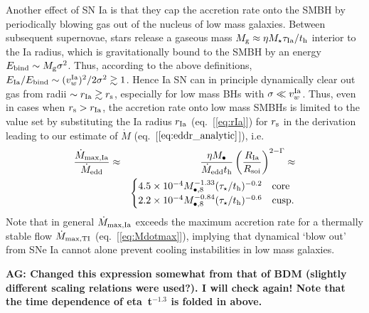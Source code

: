 \documentclass[usenatbib,fleqn]{mn2e}
\newcommand{\Mbheight}{M_{\bullet,8}}
\begin{document}
Another effect of SN Ia is that they cap the accretion rate onto the SMBH by periodically blowing gas out of the nucleus of low mass galaxies.  Between subsequent supernovae, stars release a gaseous mass $M_{\rm g} \approx \eta M_{\star}\tau_{\rm Ia}/t_{\rm h}$ interior to the Ia radius, which is gravitationally bound to the SMBH by an energy $E_{\rm bind} \sim M_{\rm g}\sigma^{2}$.  Thus, according to the above definitions, $E_{\rm Ia}/E_{\rm bind} \sim (v_{w}^{\rm Ia})^{2}/2\sigma^{2} \gtrsim 1$.  Hence Ia SN can in principle dynamically clear out gas from radii $\sim r_{\rm Ia} \gtrsim r_{\rm s}$, especially for low mass BHs with $\sigma \ll v^{\rm Ia}_{w}$.  Thus, even in cases when $r_{\rm s} > r_{\rm Ia}$, the accretion rate onto low mass SMBHs is limited to the value set by substituting the Ia radius $r_{\rm Ia}$ (eq.~[\ref{eq:rIa}]) for $r_{\rm s}$ in the derivation leading to our estimate of $\dot{M}$ (eq.~[$\ref{eq:eddr_analytic}$]), i.e.  
\begin{eqnarray}
\frac{\dot{M}_{\rm max,Ia}}{\dot{M}_{\rm edd}} &\approx& \frac{\eta M_{\bullet}}{\dot{M}_{\rm edd} t_{\rm h}}\left(\frac{R_{\rm Ia}}{R_{\rm soi}}\right)^{2-\Gamma} \approx \nonumber \\
 && \begin{cases}
    4.5 \times 10^{-4} M_{\bullet,8}^{-1.33}(\tau_{\star}/t_{\rm h})^{-0.2}
   & \text{core} \\
    2.2 \times 10^{-4} \Mbheight^{-0.84}(\tau_{\star}/t_{\rm h})^{-0.6}   & \text{cusp}.
  \end{cases}
  \label{eq:eddr_Ia}
\end{eqnarray}
Note that in general $\dot{M}_{\rm max,Ia}$ exceeds the maximum accretion rate for a thermally stable flow $\dot{M}_{\rm max,TI}$ (eq.~[\ref{eq:Mdotmax}]), implying that dynamical `blow out' from SNe Ia cannot alone prevent cooling instabilities in low mass galaxies.

{\bf AG: Changed this expression somewhat from that of BDM (slightly
  different scaling relations were used?). I will
  check again! Note that the time dependence of eta~t$^{-1.3}$ is
  folded in above.}
\end{document}
